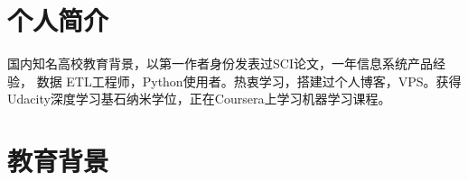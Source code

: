 \documentclass[11pt,a4paper]{moderncv-zh}
\title{ }
\begin{document}
 
 \makecvtitle
 
  \section{个人简介}
  国内知名高校教育背景，以第一作者身份发表过SCI论文，一年信息系统产品经验， 数据 ETL工程师，Python使用者。热衷学习，搭建过个人博客，VPS。获得Udacity深度学习基石纳米学位，正在Coursera上学习机器学习课程。
  
 \section{教育背景}

   
\end{document}
